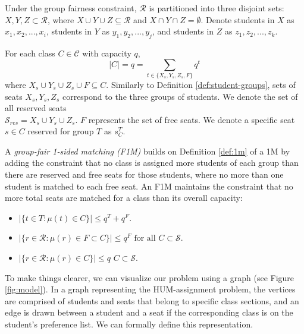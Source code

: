 \begin{definition} \label{def:student-groups}
  Under the group fairness constraint, $\mathcal{R}$ is partitioned into
  three disjoint sets: $X, Y, Z \subset \mathcal{R}$, where $X \cup Y \cup Z
  \subseteq \mathcal{R}$
  and $X \cap Y \cap
    Z = \emptyset$. Denote students in $X$ as $x_1, x_2, ..., x_i$, students in
    $Y$ as $y_1, y_2, ..., y_j$, and students in $Z$ as $z_1, z_2, ..., z_k$.
\end{definition}

\newpage

\begin{definition} \label{def:group-caps}
  For each class $C \in \mathcal{C}$ with capacity $q$, \[ |C| = q = \sum_{t \in
  \{X_s,Y_s,Z_s,F\}} q^t \] where $X_s \cup Y_s \cup Z_s \cup F \subseteq
C$. Similarly to Definition \ref{def:student-groups}, sets of seats $X_s, Y_s,
Z_s$ correspond to
the three groups of students. We denote the set of all reserved seats \\
$\mathcal{S}_{res} = X_s \cup Y_s \cup Z_s$. $F$ represents the set of free seats. We
denote a specific seat $s \in C$ reserved for group $T$ as $s_C^T$. 
\end{definition}

\begin{definition} \label{def:f1m}
  A \emph{group-fair 1-sided matching (F1M)} builds on Definition \ref{def:1m}
  of a 1M by adding the constraint that no class is assigned more students of each
  group than there are reserved and free seats for those students, where no more
  than one student is matched to each free seat. An F1M maintains the constraint that no more
  total seats are matched for a class than its overall capacity:
  \begin{itemize}
    \item $|\{t \in T : \mu(t) \in C\}| \leq q^T + q^F$.  
    \item $|\{r \in \mathcal{R} : \mu(r) \in F \subset C\}| \leq q^F \text{ for all } C
      \subset \mathcal{S}$.
    \item $|\{r \in \mathcal{R} : \mu(r) \in C\}| \leq q$  $C \subset
      \mathcal{S}$.
  \end{itemize}
\end{definition}

To make things clearer, we can visualize our problem using a graph (see Figure
\ref{fig:model}). In a graph representing the HUM-assignment problem, the
vertices are comprised
of students and seats that belong to specific class sections, and an edge is
drawn between a student and a seat if
the corresponding class is on the student's preference list. We can formally define this
representation.

